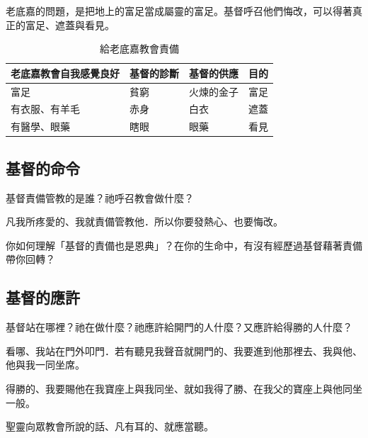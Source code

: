 老底嘉的問題，是把地上的富足當成屬靈的富足。基督呼召他們悔改，可以得著真正的富足、遮蓋與看見。

{
\renewcommand{\arraystretch}{1}
\begin{longtable}{p{3cm} | p{1.4cm} p{2.2cm} p{1cm}}
\caption{給老底嘉教會責備} \label{tab:Phrygia} \\
\hline 
老底嘉教會自我感覺良好 &
基督的診斷 &
基督的供應 &
目的 \\
\hline
富足 &
貧窮 &
火煉的金子 &
富足 \\
有衣服、有羊毛 &
赤身 &
白衣 &
遮蓋 \\
有醫學、眼藥 &
瞎眼 &
眼藥 &
看見 \\
\hline
\end{longtable}
}
\subsection{基督的命令}

\begin{ScriptureBox2}{基督責備管教的是誰？祂呼召教會做什麼？}

\item[3:19] 凡我所疼愛的、我就責備管教他．所以你要發熱心、也要悔改。

\end{ScriptureBox2}

\begin{ReaderQuestion}
你如何理解「基督的責備也是恩典」？在你的生命中，有沒有經歷過基督藉著責備帶你回轉？
\end{ReaderQuestion}

\subsection{基督的應許}

\begin{ScriptureBox2}{基督站在哪裡？祂在做什麼？祂應許給開門的人什麼？又應許給得勝的人什麼？}

\item[3:20] 看哪、我站在門外叩門．若有聽見我聲音就開門的、我要進到他那裡去、我與他、他與我一同坐席。

\item[3:21] 得勝的、我要賜他在我寶座上與我同坐、就如我得了勝、在我父的寶座上與他同坐一般。

\item[3:22] 聖靈向眾教會所說的話、凡有耳的、就應當聽。

\end{ScriptureBox2}

